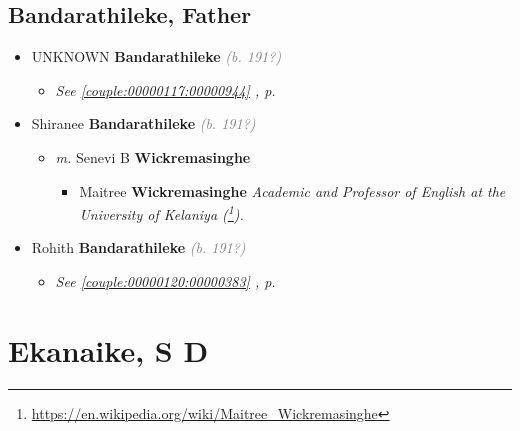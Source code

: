 \documentclass[10pt, openany]{book}
\begin{document}
\chapter{Bandarathileke, Father}
\label{00000118}
\textcolor{slmaroon}{\textit{}}
\begin{itemize}
\item{UNKNOWN \textbf{Bandarathileke} \textcolor{gray}{\textit{(b. 191?)}}
\begin{itemize}
\item{\textcolor{slteal}{\textit{See  \autoref{couple:00000117:00000944} \textit{, p. \pageref{couple:00000117:00000944} }}}}
\end{itemize}
 }
\item{Shiranee \textbf{Bandarathileke} \textcolor{gray}{\textit{(b. 191?)}}
\begin{itemize}
\item{\textit{m.} Senevi B \textbf{Wickremasinghe} \textcolor{slorange}{\textit{}}   \label{couple:00002497:00002498} \begin{itemize}
\item{Maitree \textbf{Wickremasinghe} \textcolor{slorange}{\textit{}} \textcolor{slmaroon}{\textit{Academic and Professor of English at the University of Kelaniya (\footnote{\url{https://en.wikipedia.org/wiki/Maitree_Wickremasinghe}}).}}
 }
\end{itemize}}
\end{itemize}
 }
\item{Rohith \textbf{Bandarathileke} \textcolor{gray}{\textit{(b. 191?)}}
\begin{itemize}
\item{\textcolor{slteal}{\textit{See  \autoref{couple:00000120:00000383} \textit{, p. \pageref{couple:00000120:00000383} }}}}
\end{itemize}
 }
\end{itemize}
 
\part{Ekanaike, S D}
\end{document}
